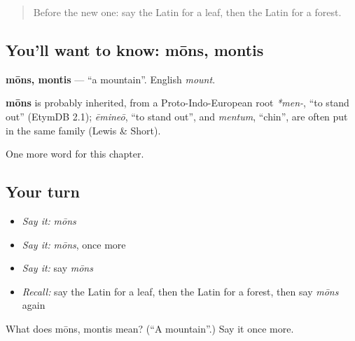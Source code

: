 \label{lesson:LA-C86-mons}



\begin{quote}
Before the new one: say the Latin for a leaf, then the Latin for a forest.
\end{quote}

\subsection*{You'll want to know: mōns, montis}
\textbf{mōns, montis} — \textquotedblleft{}a mountain\textquotedblright{}. English \emph{mount}.

\begin{cousinweb}
\textbf{mōns} is probably inherited, from a Proto-Indo-European root \emph{*men-}, \textquotedblleft{}to stand out\textquotedblright{} (EtymDB 2.1); \emph{ēmineō}, \textquotedblleft{}to stand out\textquotedblright{}, and \emph{mentum}, \textquotedblleft{}chin\textquotedblright{}, are often put in the same family (Lewis \& Short).
\end{cousinweb}

\begin{grammarlens}[title={What you've built}]
One more word for this chapter.
\end{grammarlens}

\subsection*{Your turn}
\begin{itemize}
\raggedright
  \item \emph{Say it:} \emph{mōns}
  \item \emph{Say it:} \emph{mōns}, once more
  \item \emph{Say it:} say \emph{mōns}
  \item \emph{Recall:} say the Latin for a leaf, then the Latin for a forest, then say \emph{mōns} again
\end{itemize}

\begin{tcolorbox}[breakable,colback=teal!4,colframe=teal!35!black,title={Before you move on}]
What does mōns, montis mean? (\textquotedblleft{}A mountain\textquotedblright{}.) Say it once more.
\end{tcolorbox}
